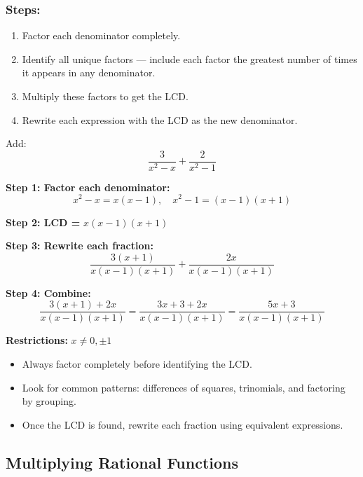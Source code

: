 \documentclass[11pt]{article}
\begin{document}
\subsubsection*{Steps:}
\begin{enumerate}
  \item Factor each denominator completely.
  \item Identify all unique factors — include each factor the greatest number of times it appears in any denominator.
  \item Multiply these factors to get the LCD.
  \item Rewrite each expression with the LCD as the new denominator.
\end{enumerate}

\begin{example}
Add:
\[
\frac{3}{x^2 - x} + \frac{2}{x^2 - 1}
\]

\textbf{Step 1: Factor each denominator:}
\[
x^2 - x = x(x - 1), \quad x^2 - 1 = (x - 1)(x + 1)
\]

\textbf{Step 2: LCD = } \( x(x - 1)(x + 1) \)

\textbf{Step 3: Rewrite each fraction:}
\[
\frac{3(x + 1)}{x(x - 1)(x + 1)} + \frac{2x}{x(x - 1)(x + 1)}
\]

\textbf{Step 4: Combine:}
\[
\frac{3(x + 1) + 2x}{x(x - 1)(x + 1)} = \frac{3x + 3 + 2x}{x(x - 1)(x + 1)} = \frac{5x + 3}{x(x - 1)(x + 1)}
\]

\textbf{Restrictions:} \( x \neq 0, \pm1 \)

\end{example}

\begin{tcolorbox}[colback=blue!5!white, colframe=blue!80!black, title=Tips for Factoring]
\begin{itemize}
  \item Always factor completely before identifying the LCD.
  \item Look for common patterns: differences of squares, trinomials, and factoring by grouping.
  \item Once the LCD is found, rewrite each fraction using equivalent expressions.
\end{itemize}
\end{tcolorbox}

\subsection{Multiplying Rational Functions}
\end{document}
